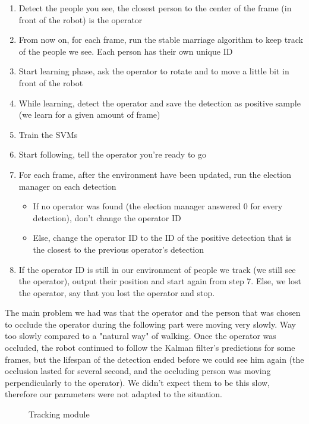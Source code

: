 \documentclass[a4paper, twocolumn]{article}
\begin{document}
    \begin{enumerate}
        \item Detect the people you see, the closest person to the center of the frame (in front of the robot) is the operator
        \item From now on, for each frame, run the stable marriage algorithm to keep track of the people we see. Each person has their own unique ID
        \item Start learning phase, ask the operator to rotate and to move a little bit in front of the robot
        \item While learning, detect the operator and save the detection as positive sample (we learn for a given amount of frame)
        \item Train the SVMs
        \item Start following, tell the operator you're ready to go
        \item For each frame, after the environment have been updated, run the election manager on each detection
        \begin{itemize}
            \item If no operator was found (the election manager answered 0 for every detection), don't change the operator ID
            \item Else, change the operator ID to the ID of the positive detection that is the closest to the previous operator's detection
        \end{itemize}
        \item If the operator ID is still in our environment of people we track (we still see the operator), output their position and start again from step 7. Else, we lost the operator, say that you lost the operator and stop.
    \end{enumerate}
    
    The main problem we had was that the operator and the person that was chosen to occlude the operator during the following part were moving very slowly. Way too slowly compared to a "natural way" of walking. Once the operator was occluded, the robot continued to follow the Kalman filter's predictions for some frames, but the lifespan of the detection ended before we could see him again (the occlusion lasted for several second, and the occluding person was moving perpendicularly to the operator). We didn't expect them to be this slow, therefore our parameters were not adapted to the situation.
    
    \begin{figure}
        \resizebox{\textwidth}{!}{}
        \caption{Tracking module}
        \label{tracker_module}
    \end{figure}
    
\end{document}
